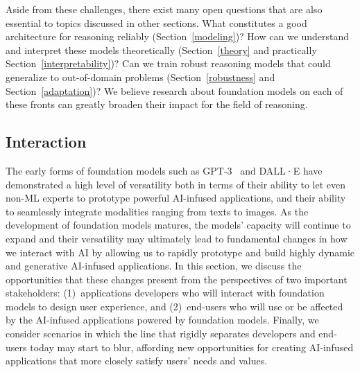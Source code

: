 Aside from these challenges, there exist many open questions that are also essential to topics discussed in other sections. What constitutes a good architecture for reasoning reliably (Section~\ref{modeling})? How can we understand and interpret these models theoretically (Section~\ref{theory} and practically Section~\ref{interpretability})? Can we train robust reasoning models that could generalize to out-of-domain problems (Section~\ref{robustness} and Section~\ref{adaptation})? We believe research about foundation models on each of these fronts can greatly broaden their impact for the field of reasoning.

\newsection
\subsection{Interaction}
\label{sec:interaction}

The early forms of foundation models such as GPT-3~\citep{brown2020gpt3} and DALL·E \citep{ramesh2021zeroshot} have demonstrated a high level of versatility both in terms of their ability to let even non-ML experts to prototype powerful AI-infused applications, and their ability to seamlessly integrate modalities ranging from texts to images. As the development of foundation models matures, the models' capacity will continue to expand and their versatility may ultimately lead to fundamental changes in how we interact with AI by allowing us to rapidly prototype and build highly dynamic and generative AI-infused applications. In this section, we discuss the opportunities that these changes present from the perspectives of two important stakeholders: (1)~applications developers who will interact with foundation models to design user experience, and (2)~end-users who will use or be affected by the AI-infused applications powered by foundation models. Finally, we consider scenarios in which the line that rigidly separates developers and end-users today may start to blur, affording new opportunities for creating AI-infused applications that more closely satisfy users' needs and values.

